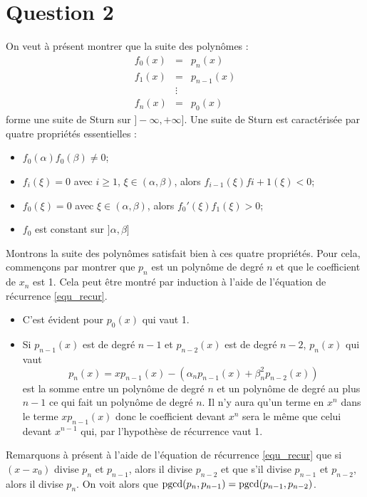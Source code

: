 \section*{Question 2}
On veut à présent montrer que la suite des polynômes :
$$
\begin{array}{ccc}
f_0(x) & = & p_n(x)\\
f_1(x) & = & p_{n-1}(x)\\
&\vdots &\\
f_n(x) & = & p_0(x)
\end{array}
$$
forme une suite de Sturn sur $] - \infty, +\infty]$. Une suite de Sturn est caractérisée par quatre propriétés essentielles :

\begin{itemize}
  \item $f_0(\alpha) f_0(\beta) \neq 0$;
  \item $f_i( \xi)=0$ avec $i \geq 1$, $\xi \in (\alpha, \beta)$, alors $f_{i-1}( \xi) f{i+1}( \xi) <0$;
  \item $f_0( \xi )=0 $ avec $\xi \in (\alpha, \beta)$, alors $f_0'( \xi ) f_1( \xi ) >0$;
\item $f_0$ est constant sur $] \alpha, \beta]$
\end{itemize}

Montrons la suite des polynômes satisfait bien à ces quatre propriétés.
Pour cela, commençons par montrer que $p_n$ est un polynôme de degré $n$
et que le coefficient de $x_n$ est 1.
Cela peut être montré par induction à l'aide de l'équation de récurrence
\eqref{equ_recur}.

\begin{itemize}
  \item C'est évident pour $p_0(x)$ qui vaut 1.
  \item Si $p_{n-1}(x)$ est de degré $n-1$ et $p_{n-2}(x)$ est de degré
    $n-2$, $p_n(x)$ qui vaut
    \[ p_n(x) = xp_{n-1}(x) - (\alpha_np_{n-1}(x) + \beta_n^2p_{n-2}(x)) \]
    est la somme entre un polynôme de degré $n$ et un polynôme de
    degré au plus $n-1$ ce qui fait un polynôme de degré $n$.
    Il n'y aura qu'un terme en $x^n$ dans le terme $xp_{n-1}(x)$ donc
    le coefficient devant $x^n$ sera le même que celui devant $x^{n-1}$ qui,
    par l'hypothèse de récurrence vaut 1.
\end{itemize}


Remarquons à présent à l'aide de l'équation de récurrence \eqref{equ_recur}
que si $(x-x_0)$ divise $p_n$ et $p_{n-1}$, alors il divise
$p_{n-2}$ et que s'il divise $p_{n-1}$ et $p_{n-2}$, alors il divise $p_n$.
On voit alors que $\operatorname{pgcd}(p_n, p_{n-1}) = \operatorname{pgcd}(p_{n-1}, p_{n-2})$.


